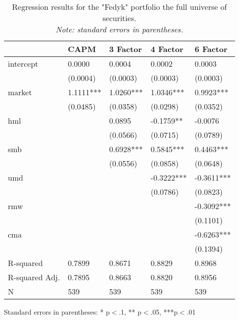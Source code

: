\begin{appendices}
\begin{table}
\caption{Regression results for the "Fedyk" portfolio the full universe of securities. \\ \textit{Note: standard errors in parentheses.}}
\label{tab:fedyk_all}
\begin{center}
\begin{tabular}{lllll}
               & CAPM      & 3 Factor  & 4 Factor   & 6 Factor    \\
\hline
intercept          & 0.0000    & 0.0004    & 0.0002     & 0.0003      \\
               & (0.0004)  & (0.0003)  & (0.0003)   & (0.0003)    \\
market           & 1.1111*** & 1.0260*** & 1.0346***  & 0.9923***   \\
               & (0.0485)  & (0.0358)  & (0.0298)   & (0.0352)    \\
hml            &           & 0.0895    & -0.1759**  & -0.0076     \\
               &           & (0.0566)  & (0.0715)   & (0.0789)    \\
smb            &           & 0.6928*** & 0.5845***  & 0.4463***   \\
               &           & (0.0556)  & (0.0858)   & (0.0648)    \\
umd            &           &           & -0.3222*** & -0.3611***  \\
               &           &           & (0.0786)   & (0.0823)    \\
rmw            &           &           &            & -0.3092***  \\
               &           &           &            & (0.1101)    \\
cma            &           &           &            & -0.6263***  \\
               &           &           &            & (0.1394)    \\
R-squared      & 0.7899    & 0.8671    & 0.8829     & 0.8968      \\
R-squared Adj. & 0.7895    & 0.8663    & 0.8820     & 0.8956      \\
N              & 539       & 539       & 539        & 539         \\
\hline
\end{tabular}
\end{center}
{\footnotesize Standard errors in parentheses: * p$<$.1, ** p$<$.05, ***p$<$.01\par}
\end{table}


\end{appendices}
